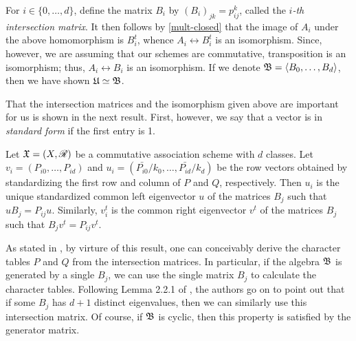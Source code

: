 \documentclass[../../../main]{subfiles}
\begin{document}
 For $i \in \{0, \dots, d\}$, define the matrix $B_i$ by $(B_i)_{jk}=p_{ij}^k$, called the {\it $i$-th intersection matrix}. It then follows by \ref{mult-closed} that the image of $A_i$ under the above homomorphism is $B_i^t$, whence $A_i \leftrightarrow B_i^t$ is an isomorphism. Since, however, we are assuming that our schemes are commutative, transposition is an isomorphism; thus, $A_i \leftrightarrow B_i$ is an isomorphism. If we denote $\mathfrak{B}=\langle B_0, \dots, B_d\rangle$, then we have shown $\mathfrak{U}\simeq\mathfrak{B}$.
 
 That the intersection matrices and the isomorphism given above are important for us is shown in the next result. First, however, we say that a vector is in {\it standard form} if the first entry is 1.
 
 \begin{thm}\label{intersect-thm}
 Let $\mathfrak{X}=(X,\mathscr{R})$ be a commutative association scheme with $d$ classes. Let $v_i=(P_{i0},\dots,P_{id})$ and $u_i=(\bar{P_{i0}}/k_0, \dots, \bar{P_{id}}/k_d)$ be the row vectors obtained by standardizing the first row and column of $P$ and $Q$, respectively. Then $u_i$ is the unique standardized common left eigenvector $u$ of the matrices $B_j$ such that $uB_j=P_{ij}u$. Similarly, $v_i^t$ is the common right eigenvector $v^t$ of the matrices $B_j$ such that $B_jv^t=P_{ij}v^t$.
 \end{thm}

 As stated in \cite{bannaialgebraic}, by virture of this result, one can conceivably derive the character tables $P$ and $Q$ from the intersection matrices. In particular, if the algebra $\mathfrak{B}$ is generated by a single $B_j$, we can use the single matrix $B_j$ to calculate the character tables. Following Lemma 2.2.1 of \cite{distance-regular-graphs}, the authors go on to point out that if some $B_j$ has $d+1$ distinct eigenvalues, then we can similarly use this intersection matrix. Of course, if $\mathfrak{B}$ is cyclic, then this property is satisfied by the generator matrix.

\biblio
\end{document}
